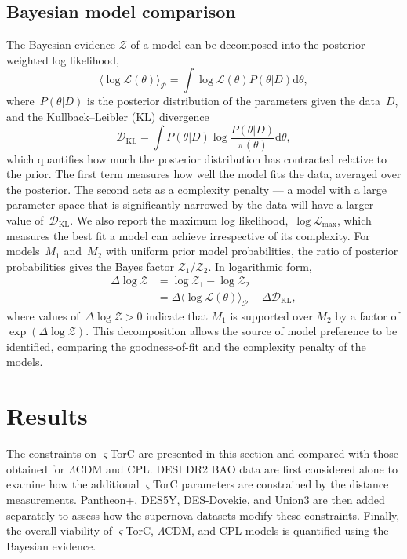 \documentclass[aps,prd,reprint,preprintnumbers,showpacs,floatfix,nofootinbib,superscriptaddress]{revtex4-2}
\newcommand{\LCDM}{\ensuremath{\Lambda\mathrm{CDM}}}
\newcommand{\CLAUD}[1]{\ifmmode\text{#1}\else#1\fi}
\begin{document}
\subsection{Bayesian model comparison}
\label{sec:model-comparison}
The Bayesian evidence $\mathcal{Z}$ of a model can be decomposed into the posterior-weighted log likelihood,
\begin{equation}
		\langle \log \mathcal{L}(\theta) \rangle_\mathcal{P} = \int \log \mathcal{L}(\theta) P(\theta | D) \mathrm{d}\theta,
\end{equation}
where~$P(\theta | D)$ is the posterior distribution of the parameters given the data~$D$, and the Kullback--Leibler (KL) divergence~\citep{Handley:2019pqx, Kullback:1951zyt}
\begin{equation}
		\mathcal{D}_{\mathrm{KL}} = \int P(\theta | D) \log \frac{P(\theta | D)}{\pi(\theta)} \mathrm{d}\theta,
\end{equation}
which quantifies how much the posterior distribution has contracted relative to the prior. The first term measures how well the model fits the data, averaged over the posterior. The second acts as a complexity penalty --- a model with a large parameter space that is significantly narrowed by the data will have a larger value of~$\mathcal{D}_{\mathrm{KL}}$. We also report the maximum log likelihood,~$\log \mathcal{L}_\mathrm{max}$, which measures the best fit a model can achieve irrespective of its complexity. For models~$M_1$ and~$M_2$ with uniform prior model probabilities, the ratio of posterior probabilities gives the Bayes factor $\mathcal{Z}_1 / \mathcal{Z}_2$. In logarithmic form,
\begin{equation}
		\begin{split}
				\Delta \log \mathcal{Z} & = \log \mathcal{Z}_1 - \log \mathcal{Z}_2\\
										& = \Delta \langle \log \mathcal{L}(\theta) \rangle_\mathcal{P} - \Delta \mathcal{D}_{\mathrm{KL}},
		\end{split}
		\label{eq:BayesFactor}
\end{equation}
where values of~$\Delta \log \mathcal{Z} > 0$ indicate that $M_1$ is supported over $M_2$ by a factor of $\exp(\Delta \log \mathcal{Z})$. This decomposition allows the source of model preference to be identified, comparing the goodness-of-fit and the complexity penalty of the models.

\section{Results}
\label{sec:stigma-results}
The constraints on $\varsigma$TorC are presented in this section and compared with those obtained for \LCDM{} and CPL. DESI DR2 BAO data are first considered alone to examine how the additional $\varsigma$TorC parameters are constrained by the distance measurements. Pantheon+, DES5Y, \CLAUD{DES-Dovekie,} and Union3 are then added separately to assess how the supernova datasets modify these constraints. Finally, the overall viability of $\varsigma$TorC, \LCDM{}, and CPL models is quantified using the Bayesian evidence.
\end{document}
